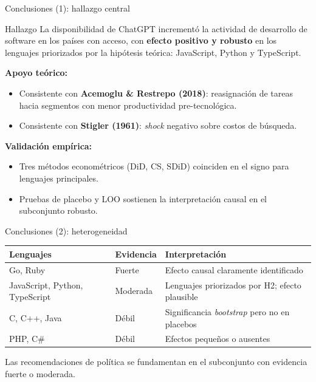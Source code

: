 \documentclass[10pt,aspectratio=169]{beamer}
\begin{document}
\begin{frame}{Conclusiones (1): hallazgo central}
\begin{block}{Hallazgo}
La disponibilidad de ChatGPT incrementó la actividad de desarrollo de software en los países con acceso, con \textbf{efecto positivo y robusto} en los lenguajes priorizados por la hipótesis teórica: JavaScript, Python y TypeScript.
\end{block}

\vspace{0.5em}
\textbf{Apoyo teórico:}
\begin{itemize}
  \item Consistente con \textbf{Acemoglu \& Restrepo (2018)}: reasignación de tareas hacia segmentos con menor productividad pre-tecnológica.
  \item Consistente con \textbf{Stigler (1961)}: \textit{shock} negativo sobre costos de búsqueda.
\end{itemize}

\vspace{0.5em}
\textbf{Validación empírica:}
\begin{itemize}
  \item Tres métodos econométricos (DiD, CS, SDiD) coinciden en el signo para lenguajes principales.
  \item Pruebas de placebo y LOO sostienen la interpretación causal en el subconjunto robusto.
\end{itemize}
\end{frame}

\begin{frame}{Conclusiones (2): heterogeneidad}
\renewcommand{\arraystretch}{1.25}
\centering
\small
\begin{tabular}{p{3.5cm}p{2.5cm}p{6cm}}
\toprule
\textbf{Lenguajes} & \textbf{Evidencia} & \textbf{Interpretación} \\
\midrule
Go, Ruby & \textcolor{pucpblue}{Fuerte} & Efecto causal claramente identificado \\
\addlinespace
JavaScript, Python, TypeScript & \textcolor{orange!80!black}{Moderada} & Lenguajes priorizados por H2; efecto plausible \\
\addlinespace
C, C++, Java & \textcolor{pucpaccent}{Débil} & Significancia \textit{bootstrap} pero no en placebos \\
\addlinespace
PHP, C\# & \textcolor{pucpaccent}{Débil} & Efectos pequeños o ausentes \\
\bottomrule
\end{tabular}

\vspace{1em}
\centering \alert{Las recomendaciones de política se fundamentan en el subconjunto con evidencia fuerte o moderada.}
\end{frame}
\end{document}
